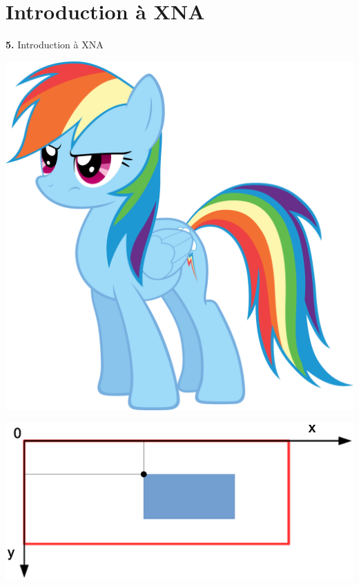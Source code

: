 \documentclass[12pt]{beamer}
\begin{document}
\section{Introduction à XNA}

\begin{frame}
    \begin{center}
        \vspace{1cm}

        {\Large \textbf{5.} Introduction à XNA} \\

        \vspace{0.5cm}

        \includegraphics[scale=0.65]{img/rd.png}
    \end{center}
\end{frame}

\begin{frame}
    \vspace{1cm}
    \begin{center}
        \includegraphics[scale=0.44]{img/xna-axis.eps}
    \end{center}
\end{frame}
\end{document}
